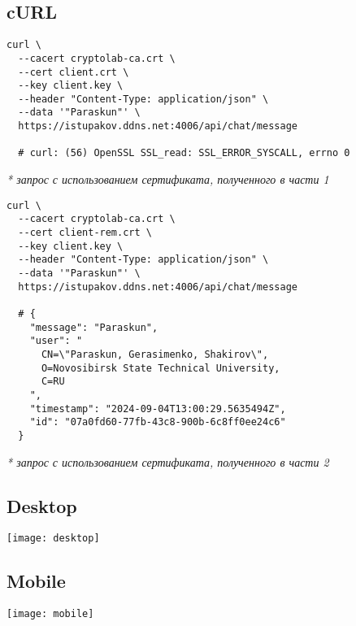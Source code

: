\documentclass[12pt, a4paper]{article}
\begin{document}
\subsection{cURL}

\begin{verbatim}
curl \
  --cacert cryptolab-ca.crt \
  --cert client.crt \
  --key client.key \
  --header "Content-Type: application/json" \
  --data '"Paraskun"' \
  https://istupakov.ddns.net:4006/api/chat/message

  # curl: (56) OpenSSL SSL_read: SSL_ERROR_SYSCALL, errno 0
\end{verbatim}
\textit{* запрос с использованием сертификата, полученного в части 1}

\begin{verbatim}
curl \
  --cacert cryptolab-ca.crt \
  --cert client-rem.crt \
  --key client.key \
  --header "Content-Type: application/json" \
  --data '"Paraskun"' \
  https://istupakov.ddns.net:4006/api/chat/message

  # {
    "message": "Paraskun",
    "user": "
      CN=\"Paraskun, Gerasimenko, Shakirov\",
      O=Novosibirsk State Technical University,
      C=RU
    ",
    "timestamp": "2024-09-04T13:00:29.5635494Z",
    "id": "07a0fd60-77fb-43c8-900b-6c8ff0ee24c6"
  }
\end{verbatim}
\textit{* запрос с использованием сертификата, полученного в части 2}

\subsection{Desktop}

\texttt{[image: desktop]}

\subsection{Mobile}


\texttt{[image: mobile]}
\end{document}
